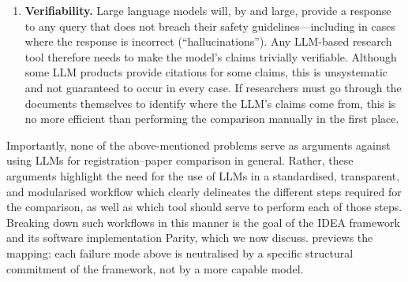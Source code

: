 \documentclass{article}
\begin{document}
\begin{enumerate}
  \item \textbf{Verifiability.} Large language models will, by and large,
  provide a response to any query that does not breach their safety
  guidelines---including in cases where the response is incorrect
  (``hallucinations''). Any LLM-based research tool therefore needs to make the
  model's claims trivially verifiable. Although some LLM products provide
  citations for some claims, this is unsystematic and not guaranteed to occur in
  every case. If researchers must go through the documents themselves to
  identify where the LLM's claims come from, this is no more efficient than
  performing the comparison manually in the first place.
\end{enumerate}

Importantly, none of the above-mentioned problems serve as arguments against
using LLMs for registration--paper comparison in general. Rather, these
arguments highlight the need for the use of LLMs in a standardised, transparent,
and modularised workflow which clearly delineates the different steps required
for the comparison, as well as which tool should serve to perform each of those
steps. Breaking down such workflows in this manner is the goal of the IDEA
framework and its software implementation Parity, which we now discuss.
 previews the mapping: each failure mode above is
neutralised by a specific structural commitment of the framework, not by a more
capable model.
\end{document}
